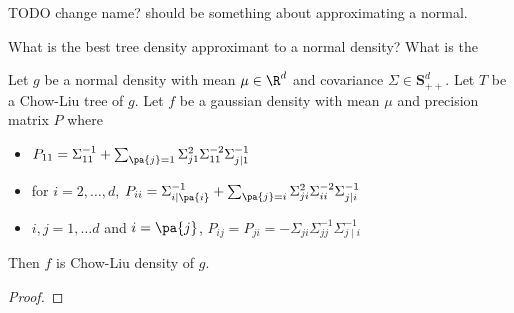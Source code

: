 
TODO change name?
should be something about approximating a normal.

What is the best tree density approximant to a normal density?
What is the


\begin{prop}


Let $g$ be a normal density with mean $\mu \in \R^d$ and covariance $\Sigma \in \mathbf{S}^d_{++}$.
Let $T$ be a Chow-Liu tree of $g$.
Let $f$ be a gaussian density with mean $\mu$ and precision matrix $P$ where
  \begin{itemize}
    \item $P_{11} = \Sigma_{11}^{-1} + \sum_{\pa{j} = 1}
\Sigma_{j1}^2\Sigma_{11}^{-2}\Sigma_{j\mid 1}^{-1}$
      \item for $i = 2, \dots, d$, $P_{ii} = \Sigma_{i\mid\pa{i}}^{-1} + \sum_{\pa{j} = i} \Sigma_{ji}^2\Sigma_{ii}^{-2}\Sigma_{j\mid i}^{-1}$
      \item $i, j = 1, \dots d$ and $i = \pa{j}$, $P_{ij} = P_{ji} = -\Sigma_{ji}\Sigma_{jj}^{-1}\Sigma_{j \mid i}^{-1}$
  \end{itemize}
  Then $f$ is Chow-Liu density of $g$.

\begin{proof}

\end{proof}

\end{prop}

